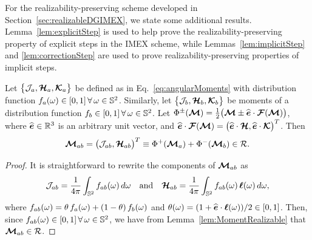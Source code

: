 For the realizability-preserving scheme developed in Section~\ref{sec:realizableDGIMEX}, we state some additional results.  
Lemma~\ref{lem:explicitStep} is used to help prove the realizability-preserving property of explicit steps in the IMEX scheme, while Lemmas~\ref{lem:implicitStep} and \ref{lem:correctionStep} are used to prove realizability-preserving properties of implicit steps.  
\begin{lemma}
  Let $\big\{\mathcal{J}_{a},\boldsymbol{\mathcal{H}}_{a},\boldsymbol{\mathcal{K}}_{a}\big\}$ be defined as in Eq.~\eqref{eq:angularMoments} with distribution function $f_{a}(\omega)\in[0,1]\,\forall\,\omega\in\mathbb{S}^{2}$.  
  Similarly, let $\big\{\mathcal{J}_{b},\boldsymbol{\mathcal{H}}_{b},\boldsymbol{\mathcal{K}}_{b}\big\}$ be moments of a distribution function $f_{b}\in[0,1]\,\forall\,\omega\in\mathbb{S}^{2}$.  
  Let $\Phi^{\pm}(\boldsymbol{\mathcal{M}})=\frac{1}{2}\big(\boldsymbol{\mathcal{M}}\pm\widehat{\boldsymbol{e}}\cdot\boldsymbol{\mathcal{F}}(\boldsymbol{\mathcal{M}})\big)$, where $\widehat{\boldsymbol{e}}\in\mathbb{R}^{3}$ is an arbitrary unit vector, and $\widehat{\boldsymbol{e}}\cdot\boldsymbol{\mathcal{F}}(\boldsymbol{\mathcal{M}})=\big(\widehat{\boldsymbol{e}}\cdot\boldsymbol{\mathcal{H}},\widehat{\boldsymbol{e}}\cdot\boldsymbol{\mathcal{K}}\big)^{T}$.  
  Then
  \begin{equation*}
    \boldsymbol{\mathcal{M}}_{ab} = \big(\mathcal{J}_{ab},\boldsymbol{\mathcal{H}}_{ab}\big)^{T} \equiv \Phi^{+}(\boldsymbol{\mathcal{M}}_{a})+\Phi^{-}(\boldsymbol{\mathcal{M}}_{b})\in\mathcal{R}.
  \end{equation*}
  \label{lem:explicitStep}
\end{lemma}
\begin{proof}
  It is straightforward to rewrite the components of $\boldsymbol{\mathcal{M}}_{ab}$ as
  \begin{equation*}
    \mathcal{J}_{ab}=\frac{1}{4\pi}\int_{\mathbb{S}^{2}}f_{ab}(\omega)\,d\omega
    \quad\text{and}\quad
    \boldsymbol{\mathcal{H}}_{ab}=\frac{1}{4\pi}\int_{\mathbb{S}^{2}}f_{ab}(\omega)\,\boldsymbol{\ell}(\omega)\,d\omega,
  \end{equation*}
  where $f_{ab}(\omega)=\theta\,f_{a}(\omega)+(1-\theta)\,f_{b}(\omega)$ and $\theta(\omega)=(1+\widehat{\boldsymbol{e}}\cdot\boldsymbol{\ell}(\omega))/2\in[0,1]$.  
  Then, since $f_{ab}(\omega)\in[0,1]\,\forall\,\omega\in\mathbb{S}^{2}$, we have from Lemma~\ref{lem:MomentRealizable} that $\boldsymbol{\mathcal{M}}_{ab}\in\mathcal{R}$.  
\end{proof}

